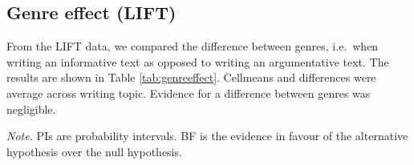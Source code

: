 \documentclass[
  english,
  man,floatsintext]{apa7}
\begin{document}
\clearpage
\makeatletter
\efloat@restorefloats
\makeatother


\begin{appendix}
\section{}
\hypertarget{genre-effect-lift}{%
\subsection{Genre effect (LIFT)}\label{genre-effect-lift}}

From the LIFT data, we compared the difference between genres, i.e.~when
writing an informative text as opposed to writing an argumentative text.
The results are shown in Table \ref{tab:genreeffect}. Cellmeans and
differences were average across writing topic. Evidence for a difference
between genres was negligible.

\begin{center}
\begin{ThreePartTable}

\begin{TableNotes}[para]
\normalsize{\textit{Note.} PIs are probability intervals. BF is the evidence in favour of the alternative hypothesis over the null hypothesis.}
\end{TableNotes}

\footnotesize{

}
\end{ThreePartTable}
\end{center}
\end{appendix}
\end{document}
